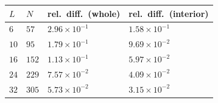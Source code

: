 \begin{tabular}{llll}
\toprule
$L$ & $N$ & rel.\ diff.\ (whole) & rel.\ diff.\ (interior) \\
\midrule
\(6\) & \(57\) & \(2.96\times10^{-1}\) & \(1.58\times10^{-1}\) \\
\(10\) & \(95\) & \(1.79\times10^{-1}\) & \(9.69\times10^{-2}\) \\
\(16\) & \(152\) & \(1.13\times10^{-1}\) & \(5.97\times10^{-2}\) \\
\(24\) & \(229\) & \(7.57\times10^{-2}\) & \(4.09\times10^{-2}\) \\
\(32\) & \(305\) & \(5.73\times10^{-2}\) & \(3.15\times10^{-2}\) \\
\bottomrule
\end{tabular}
